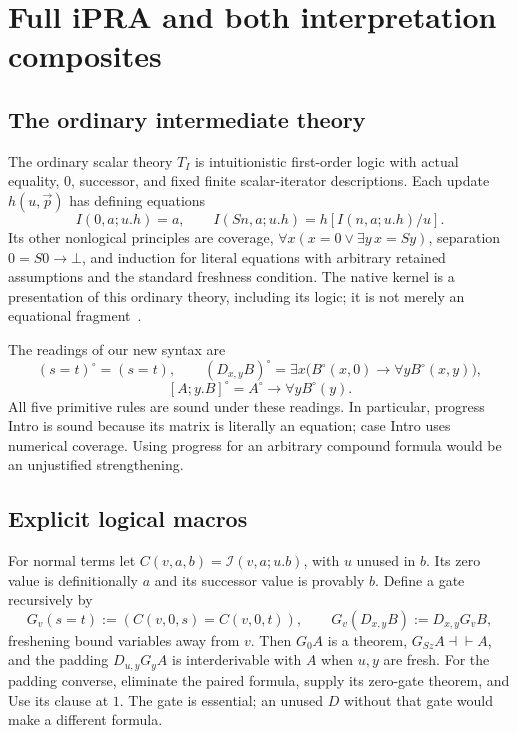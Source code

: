 \documentclass[11pt]{article}
\theoremstyle{definition}
\newcommand{\si}{\mathcal I}
\begin{document}
\section{Full iPRA and both interpretation composites}
\label{sec:interpretation}

\subsection{The ordinary intermediate theory}

The ordinary scalar theory $T_I$ is intuitionistic first-order logic with
actual equality, $0$, successor, and fixed finite scalar-iterator
descriptions. Each update $h(u,\vec p)$ has defining equations
\[
 I(0,a;u.h)=a,\qquad I(Sn,a;u.h)=h[I(n,a;u.h)/u].
\]
Its other nonlogical principles are coverage,
$\forall x(x=0\lor\exists y\,x=Sy)$, separation
$0=S0\to\bot$, and induction for literal equations with arbitrary
retained assumptions and the standard freshness condition. The native
kernel is a presentation of this ordinary theory, including its logic;
it is not merely an equational fragment~\cite{bridge}.

The readings of our new syntax are
\[
 (s=t)^\circ=(s=t),\qquad
 (D_{x,y}B)^\circ=\exists x\bigl(B^\circ(x,0)\to\forall yB^\circ(x,y)\bigr),
\]
\[
                 [A;y.B]^\circ=A^\circ\to\forall yB^\circ(y).
\]
All five primitive rules are sound under these readings. In particular,
progress Intro is sound because its matrix is literally an equation;
case Intro uses numerical coverage. Using progress for an arbitrary
compound formula would be an unjustified strengthening.

\subsection{Explicit logical macros}

For normal terms let $C(v,a,b)=\si(v,a;u.b)$, with $u$ unused in $b$.
Its zero value is definitionally $a$ and its successor value is provably
$b$. Define a gate recursively by
\[
G_v(s=t):=(C(v,0,s)=C(v,0,t)),\qquad
G_v(D_{x,y}B):=D_{x,y}G_vB,
\]
freshening bound variables away from $v$. Then $G_0A$ is a theorem,
$G_{Sz}A\dashv\vdash A$, and the padding
$D_{u,y}G_yA$ is interderivable with $A$ when $u,y$ are fresh.
For the padding converse, eliminate the paired formula, supply its
zero-gate theorem, and Use its clause at $1$. The gate is essential;
an unused $D$ without that gate would make a different formula.
\end{document}
